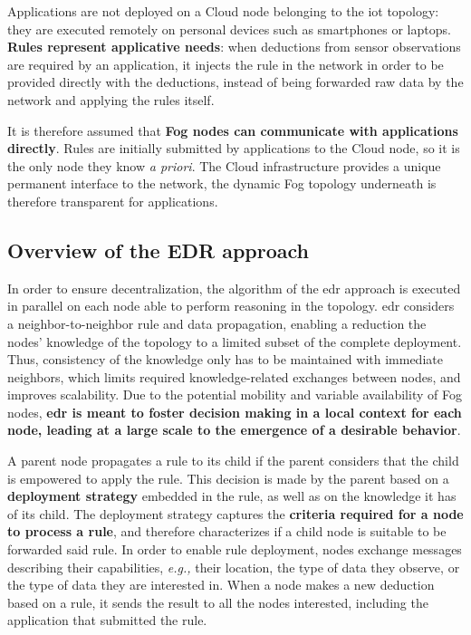 \documentclass{iosart2c}
\begin{document}
Applications are not deployed on a Cloud node belonging to the \gls{iot} topology: they are executed remotely on personal devices such as smartphones or laptops.
\textbf{Rules represent applicative needs}: when deductions from sensor observations are required by an application, it injects the rule in the network in order to be provided directly with the deductions, instead of being forwarded raw data by the network and applying the rules itself.

It is therefore assumed that \textbf{Fog nodes can communicate with applications directly}.
Rules are initially submitted by applications to the Cloud node, so it is the only node they know \textit{a priori}. 
The Cloud infrastructure provides a unique permanent interface to the network, the dynamic Fog topology underneath is therefore transparent for applications.

\subsection{Overview of the EDR approach}
\label{subs:edr_overview}

In order to ensure decentralization, the algorithm of the \gls{edr} approach is executed in parallel on each node able to perform reasoning in the topology. 
\gls{edr} considers a neighbor-to-neighbor rule and data propagation, enabling a reduction the nodes' knowledge of the topology to a limited subset of the complete deployment. 
Thus, consistency of the knowledge only has to be maintained with immediate neighbors, which limits required knowledge-related exchanges between nodes, and improves scalability.
Due to the potential mobility and variable availability of Fog nodes, \textbf{\gls{edr} is meant to foster decision making in a local context for each node, leading at a large scale to the emergence of a desirable behavior}.

A parent node propagates a rule to its child if the parent considers that the child is empowered to apply the rule.
This decision is made by the parent based on a \textbf{deployment strategy} embedded in the rule, as well as on the knowledge it has of its child.
The deployment strategy captures the \textbf{criteria required for a node to process a rule}, and therefore characterizes if a child node is suitable to be forwarded said rule.
In order to enable rule deployment, nodes exchange messages describing their capabilities, \textit{e.g.,} their location, the type of data they observe, or the type of data they are interested in.
When a node makes a new deduction based on a rule, it sends the result to all the nodes interested, including the application that submitted the rule.
\end{document}

